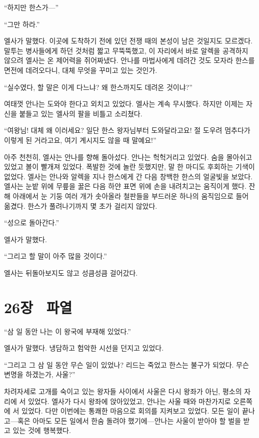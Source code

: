 ``하지만 한스가—''

``그만 하라.''

엘사가 말했다. 이곳에 도착하기 전에 있던 전쟁 때의 본성이 남은 것일지도 모르겠다. 말투는 병사들에게 하던 것처럼 짧고 무뚝뚝했고, 이 자리에서 바로 알렉을 공격하지 않으려 엘사는 온 제어력을 쥐어짜냈다. 안나를 마법사에게 데려간 것도 모자라 한스를 면전에 데려오다니, 대체 무엇을 꾸미고 있는 것인가.

``실수였다, 할 말은 이게 다느냐? 왜 한스까지도 데려온 것이냐?''

여태껏 안나는 도와야 한다고 외치고 있었다. 엘사는 계속 무시했다. 하지만 이제는 자신을 붙들고 있는 엘사의 팔을 비틀고 소리쳤다.

``여왕님! 대체 왜 이러세요? 일단 한스 왕자님부터 도와달라고요! 절 도우려 멈추다가 이렇게 된 거라고요, 여기 계시지도 않을 때 말예요!''

아주 천천히, 엘사는 안나를 향해 돌아섰다. 안나는 헉헉거리고 있었다. 숨을 몰아쉬고 있었고 볼이 빨개져 있었다. 폭발한 것에 놀란 듯했지만, 말 한 마디도 후회하는 기색이 없었다. 엘사는 안나와 알렉을 지나 한스에게 간 다음 창백한 한스의 얼굴빛을 보았다. 엘사는 눈밭 위에 무릎을 꿇은 다음 하얀 표면 위에 손을 내려치고는 움직이게 했다. 잔해 아래에서 눈 기둥 여러 개가 솟아올라 철판들을 부드러운 하나의 움직임으로 들어 옮겼다. 한스가 풀려나기까지 몇 초가 걸리지 않았다.

``성으로 돌아간다.''

엘사가 말했다.

``그리고 할 말이 아주 많을 것이다.''

엘사는 뒤돌아보지도 않고 성큼성큼 걸어갔다.



\chapter[26장  파열][26장\hspace*{.5em}파열]{26장 \ 파열}



\forceindent``삼 일 동안 나는 이 왕국에 부재해 있었다.''

엘사가 말했다. 냉담하고 험악한 시선을 던지고 있었다.

``그리고 그 삼 일 동안 무슨 일이 있었나? 리드는 죽었고 한스는 불구가 되었다. 무슨 변명을 하겠는가, 사울?''

차려자세로 고개를 숙이고 있는 왕자들 사이에서 사울은 다시 왕좌가 아닌, 평소의 자리에 서 있었다. 엘사가 다시 왕좌에 앉아있었고, 안나는 사울 때와 마찬가지로 오른쪽에 서 있었다. 다만 이번에는 통쾌한 마음으로 회의를 지켜보고 있었다. 모든 일이 끝나고—혹은 아마도 모든 일에서 한숨 돌려야 했기에—안나는 사울이 받아야 할 벌을 받고 있는 것에 행복했다.

